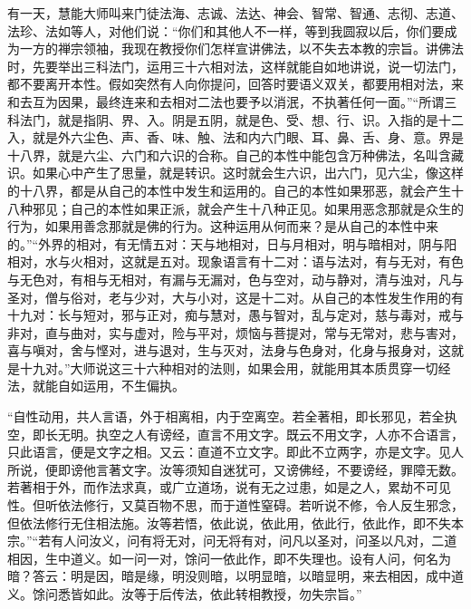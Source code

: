 \documentclass[12pt,twoside,openany]{book}
\newcommand{\kai}[1]{{\CJKfamily{kai}#1}}
\begin{document}
\kai{有一天，慧能大师叫来门徒法海、志诚、法达、神会、智常、智通、志彻、志道、法珍、法如等人，对他们说：“你们和其他人不一样，等到我圆寂以后，你们要成为一方的禅宗领袖，我现在教授你们怎样宣讲佛法，以不失去本教的宗旨。讲佛法时，先要举出三科法门，运用三十六相对法，这样就能自如地讲说，说一切法门，都不要离开本性。假如突然有人向你提问，回答时要语义双关，都要用相对法，来和去互为因果，最终连来和去相对二法也要予以消泯，不执著任何一面。”“所谓三科法门，就是指阴、界、入。阴是五阴，就是色、受、想、行、识。入指的是十二入，就是外六尘色、声、香、味、触、法和内六门眼、耳、鼻、舌、身、意。界是十八界，就是六尘、六门和六识的合称。自己的本性中能包含万种佛法，名叫含藏识。如果心中产生了思量，就是转识。这时就会生六识，出六门，见六尘，像这样的十八界，都是从自己的本性中发生和运用的。自己的本性如果邪恶，就会产生十八种邪见；自己的本性如果正派，就会产生十八种正见。如果用恶念那就是众生的行为，如果用善念那就是佛的行为。这种运用从何而来？是从自己的本性中来的。”“外界的相对，有无情五对：天与地相对，日与月相对，明与暗相对，阴与阳相对，水与火相对，这就是五对。现象语言有十二对：语与法对，有与无对，有色与无色对，有相与无相对，有漏与无漏对，色与空对，动与静对，清与浊对，凡与圣对，僧与俗对，老与少对，大与小对，这是十二对。从自己的本性发生作用的有十九对：长与短对，邪与正对，痴与慧对，愚与智对，乱与定对，慈与毒对，戒与非对，直与曲对，实与虚对，险与平对，烦恼与菩提对，常与无常对，悲与害对，喜与嗔对，舍与悭对，进与退对，生与灭对，法身与色身对，化身与报身对，这就是十九对。”大师说这三十六种相对的法则，如果会用，就能用其本质贯穿一切经法，就能自如运用，不生偏执。}

“自性动用，共人言语，外于相离相，内于空离空。若全著相，即长邪见，若全执空，即长无明。执空之人有谤经，直言不用文字。既云不用文字，人亦不合语言，只此语言，便是文字之相。又云：直道不立文字。即此不立两字，亦是文字。见人所说，便即谤他言著文字。汝等须知自迷犹可，又谤佛经，不要谤经，罪障无数。若著相于外，而作法求真，或广立道场，说有无之过患，如是之人，累劫不可见性。但听依法修行，又莫百物不思，而于道性窒碍。若听说不修，令人反生邪念，但依法修行无住相法施。汝等若悟，依此说，依此用，依此行，依此作，即不失本宗。”“若有人问汝义，问有将无对，问无将有对，问凡以圣对，问圣以凡对，二道相因，生中道义。如一问一对，馀问一依此作，即不失理也。设有人问，何名为暗？答云：明是因，暗是缘，明没则暗，以明显暗，以暗显明，来去相因，成中道义。馀问悉皆如此。汝等于后传法，依此转相教授，勿失宗旨。”
\end{document}
